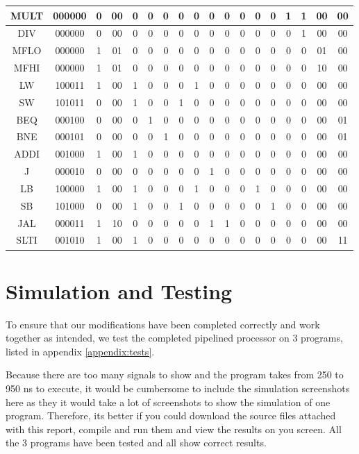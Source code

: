 \documentclass[titlepage,12pt,oneside,a4paper]{article}
\begin{document}
\begin{center}
\begin{tabular}{|c|c|c|c|c|c|c|c|c|c|c|c|c|c|c|c|c|c|}
\hline
MULT & 000000 & 0 & 00 & 0 & 0 & 0 & 0 & 0 & 0 & 0 & 0 & 0 & 0 & 1 & 1 & 00 & 00 \\
\hline
DIV & 000000 & 0 & 00 & 0 & 0 & 0 & 0 & 0 & 0 & 0 & 0 & 0 & 0 & 0 & 1 & 00 & 00 \\
\hline
MFLO & 000000 & 1 & 01 & 0 & 0 & 0 & 0 & 0 & 0 & 0 & 0 & 0 & 0 & 0 & 0 & 01 & 00 \\
\hline
MFHI & 000000 & 1 & 01 & 0 & 0 & 0 & 0 & 0 & 0 & 0 & 0 & 0 & 0 & 0 & 0 & 10 & 00 \\
\hline
LW & 100011 & 1 & 00 & 1 & 0 & 0 & 0 & 1 & 0 & 0 & 0 & 0 & 0 & 0 & 0 & 00 & 00 \\
\hline
SW & 101011 & 0 & 00 & 1 & 0 & 0 & 1 & 0 & 0 & 0 & 0 & 0 & 0 & 0 & 0 & 00 & 00 \\
\hline
BEQ & 000100 & 0 & 00 & 0 & 1 & 0 & 0 & 0 & 0 & 0 & 0 & 0 & 0 & 0 & 0 & 00 & 01 \\
\hline
BNE & 000101 & 0 & 00 & 0 & 0 & 1 & 0 & 0 & 0 & 0 & 0 & 0 & 0 & 0 & 0 & 00 & 01 \\
\hline
ADDI & 001000 & 1 & 00 & 1 & 0 & 0 & 0 & 0 & 0 & 0 & 0 & 0 & 0 & 0 & 0 & 00 & 00 \\
\hline
J & 000010 & 0 & 00 & 0 & 0 & 0 & 0 & 0 & 1 & 0 & 0 & 0 & 0 & 0 & 0 & 00 & 00 \\
\hline
LB & 100000 & 1 & 00 & 1 & 0 & 0 & 0 & 1 & 0 & 0 & 0 & 1 & 0 & 0 & 0 & 00 & 00 \\
\hline
SB & 101000 & 0 & 00 & 1 & 0 & 0 & 1 & 0 & 0 & 0 & 0 & 0 & 1 & 0 & 0 & 00 & 00 \\
\hline
JAL & 000011 & 1 & 10 & 0 & 0 & 0 & 0 & 0 & 1 & 1 & 0 & 0 & 0 & 0 & 0 & 00 & 00 \\
\hline
SLTI & 001010 & 1 & 00 & 1 & 0 & 0 & 0 & 0 & 0 & 0 & 0 & 0 & 0 & 0 & 0 & 00 & 11 \\
\hline

\end{tabular}
\end{center}

\section{Simulation and Testing}
To ensure that our modifications have been completed correctly and work together as intended, we test the completed pipelined processor on 3 programs, listed in appendix \ref{appendix:tests}.

Because there are too many signals to show and the program takes from 250 to 950 ns to execute, it would be cumbersome to include the simulation screenshots here as they it would take a lot of screenshots to show the simulation of one program. Therefore, its better if you could download the source files attached with this report, compile and run them and view the results on you screen. All the 3 programs have been tested and all show correct results.
\end{document}
